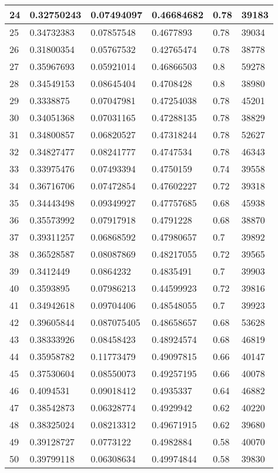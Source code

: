 \begin{longtable}{|l|l|l|l|l|l|}
24 & 0.32750243 & 0.07494097 & 0.46684682 & 0.78 & 39183 \\ \hline 
25 & 0.34732383 & 0.07857548 & 0.4677893 & 0.78 & 39034 \\ \hline 
26 & 0.31800354 & 0.05767532 & 0.42765474 & 0.78 & 38778 \\ \hline 
27 & 0.35967693 & 0.05921014 & 0.46866503 & 0.8 & 59278 \\ \hline 
28 & 0.34549153 & 0.08645404 & 0.4708428 & 0.8 & 38980 \\ \hline 
29 & 0.3338875 & 0.07047981 & 0.47254038 & 0.78 & 45201 \\ \hline 
30 & 0.34051368 & 0.07031165 & 0.47288135 & 0.78 & 38829 \\ \hline 
31 & 0.34800857 & 0.06820527 & 0.47318244 & 0.78 & 52627 \\ \hline 
32 & 0.34827477 & 0.08241777 & 0.4747534 & 0.78 & 46343 \\ \hline 
33 & 0.33975476 & 0.07493394 & 0.4750159 & 0.74 & 39558 \\ \hline 
34 & 0.36716706 & 0.07472854 & 0.47602227 & 0.72 & 39318 \\ \hline 
35 & 0.34443498 & 0.09349927 & 0.47757685 & 0.68 & 45938 \\ \hline 
36 & 0.35573992 & 0.07917918 & 0.4791228 & 0.68 & 38870 \\ \hline 
37 & 0.39311257 & 0.06868592 & 0.47980657 & 0.7 & 39892 \\ \hline 
38 & 0.36528587 & 0.08087869 & 0.48217055 & 0.72 & 39565 \\ \hline 
39 & 0.3412449 & 0.0864232 & 0.4835491 & 0.7 & 39903 \\ \hline 
40 & 0.3593895 & 0.07986213 & 0.44599923 & 0.72 & 39816 \\ \hline 
41 & 0.34942618 & 0.09704406 & 0.48548055 & 0.7 & 39923 \\ \hline 
42 & 0.39605844 & 0.087075405 & 0.48658657 & 0.68 & 53628 \\ \hline 
43 & 0.38333926 & 0.08458423 & 0.48924574 & 0.68 & 46819 \\ \hline 
44 & 0.35958782 & 0.11773479 & 0.49097815 & 0.66 & 40147 \\ \hline 
45 & 0.37530604 & 0.08550073 & 0.49257195 & 0.66 & 40078 \\ \hline 
46 & 0.4094531 & 0.09018412 & 0.4935337 & 0.64 & 46882 \\ \hline 
47 & 0.38542873 & 0.06328774 & 0.4929942 & 0.62 & 40220 \\ \hline 
48 & 0.38325024 & 0.08213312 & 0.49671915 & 0.62 & 39680 \\ \hline 
49 & 0.39128727 & 0.0773122 & 0.4982884 & 0.58 & 40070 \\ \hline 
50 & 0.39799118 & 0.06308634 & 0.49974844 & 0.58 & 39830 \\ \hline 
\end{longtable}